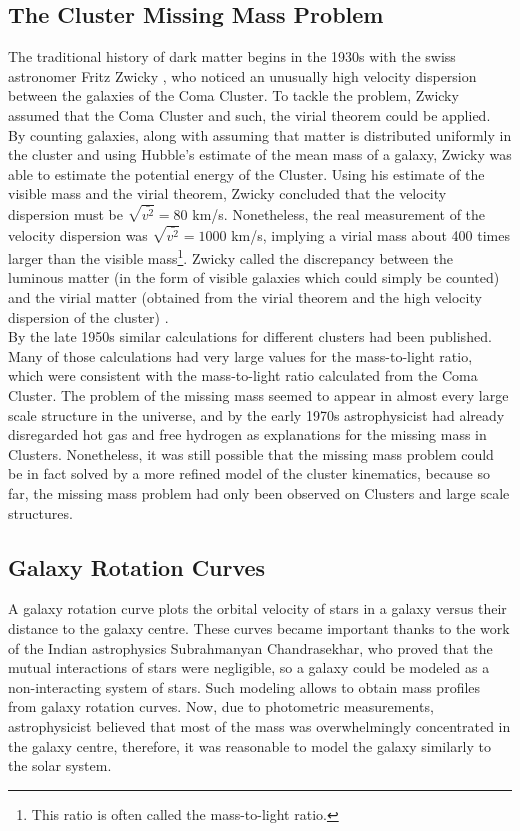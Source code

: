 \subsection{The Cluster Missing Mass Problem}
The traditional history of dark matter begins in the 1930s with the swiss astronomer Fritz Zwicky\cite{aHistory} \cite{tasiCline}, who noticed an unusually high velocity dispersion between the galaxies of the Coma Cluster.
To tackle the problem, Zwicky assumed that the Coma Cluster  \cite{englishZwicky} and such, the virial theorem could be applied.
By counting galaxies, along with assuming that matter is distributed uniformly in the cluster and using Hubble's estimate of the mean mass of a galaxy, Zwicky was able to estimate the potential energy of the Cluster.
Using his estimate of the visible mass and the virial theorem, Zwicky concluded that the velocity dispersion must be $\sqrt{\bar{v^2}} = 80$ km/s.
Nonetheless, the real measurement of the velocity dispersion was $\sqrt{\bar{v^2}} = 1000$ km/s, implying a virial mass about 400 times larger than the visible mass\footnote{This ratio is often called the mass-to-light ratio.}.
Zwicky called the discrepancy between the luminous matter (in the form of visible galaxies which could simply be counted) and the virial matter (obtained from the virial theorem and the high velocity dispersion of the cluster) . \\

By the late 1950s similar calculations for different clusters had been published. Many of those calculations had very large values for the mass-to-light ratio\cite{schwarzschildSon}, which were consistent with the mass-to-light ratio calculated from the Coma Cluster. The problem of the missing mass seemed to appear in almost every large scale structure in the universe, and by the early 1970s astrophysicist had already disregarded hot gas\cite{meekins} and free hydrogen\cite{penzias} as explanations for the missing mass in Clusters. Nonetheless, it was still possible that the missing mass problem could be in fact solved by a more refined model of the cluster kinematics, because so far, the missing mass problem had only been observed on Clusters and large scale structures.

\subsection{Galaxy Rotation Curves}
A galaxy rotation curve plots the orbital velocity of stars in a galaxy versus their distance to the galaxy centre.
These curves became important thanks to the work of the Indian astrophysics Subrahmanyan Chandrasekhar, who proved that the mutual interactions of stars were negligible, so a galaxy could be modeled as a non-interacting system of stars. Such modeling allows to obtain mass profiles from galaxy rotation curves.
Now, due to photometric measurements, astrophysicist believed that most of the mass was overwhelmingly concentrated  in the galaxy centre, therefore, it was reasonable to model the galaxy similarly to the solar system.

